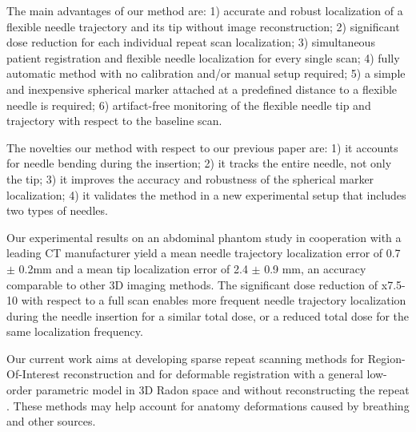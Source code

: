 The main advantages of our method are:
1) accurate and robust localization of a flexible needle trajectory and its tip without image reconstruction;
2) significant dose reduction for each individual repeat scan localization;
3) simultaneous patient registration and flexible needle localization for every single scan; 
4) fully automatic method with no calibration and/or manual setup required; 
5) a simple and inexpensive spherical marker attached at a predefined distance to a flexible needle is required; 
6) artifact-free monitoring of the flexible needle tip and trajectory with respect to the baseline scan.

The novelties our method with respect to our previous paper are: 1) it accounts for needle bending during the insertion; 2) it tracks the entire needle, not only the tip; 3) it improves the accuracy and robustness of the spherical marker localization; 4) it validates the method in a new experimental setup that includes two types of needles. 

Our experimental results on an abdominal phantom study
in cooperation with a leading CT manufacturer yield a mean needle trajectory localization error of 0.7 $\pm$ 0.2mm and a mean tip localization error of 2.4 $\pm$ 0.9 mm, an accuracy comparable to other 3D imaging methods. The significant dose reduction of x7.5-10 with respect to a full scan enables more frequent needle trajectory localization during the needle insertion for a similar total dose, or a reduced total dose for the same localization frequency.

Our current work aims at developing sparse repeat scanning methods for Region-Of-Interest reconstruction and  for deformable registration with a general low-order parametric
model in 3D Radon space and without reconstructing the repeat \cite{adelmanmsc2018}. These methods may help account for anatomy deformations caused by breathing and other sources. 






